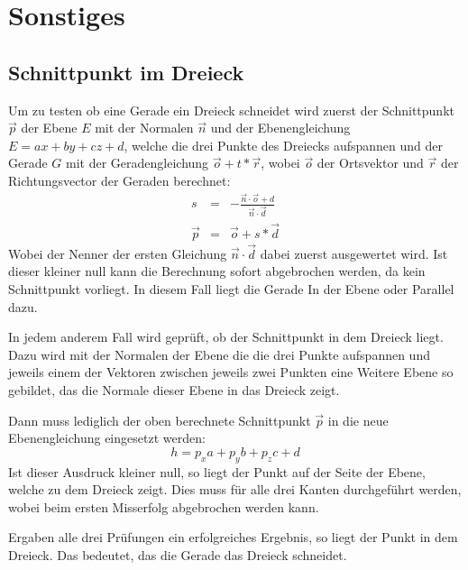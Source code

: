 \documentclass[final,a4paper,11pt,notitlepage,halfparskip]{scrreprt}
\begin{document}
\section{Sonstiges}
\subsection{Schnittpunkt im Dreieck}
Um zu testen ob eine Gerade ein Dreieck schneidet wird zuerst der Schnittpunkt
$\vec{p}$ der Ebene $E$ mit der Normalen $\vec{n}$ und der Ebenengleichung $E =
ax + by + cz + d$, welche die drei Punkte des Dreiecks aufspannen und der Gerade 
$G$ mit der Geradengleichung $\vec{o} + t*\vec{r}$, wobei $\vec{o}$ der 
Ortsvektor und $\vec{r}$ der Richtungsvector der Geraden berechnet:
\begin{eqnarray*}
    s       &=& -\frac{\vec{n} \cdot \vec{o} + d}{\vec{n} \cdot \vec{d}}\\
    \vec{p} &=& \vec{o} + s * \vec{d}
\end{eqnarray*}
Wobei der Nenner der ersten Gleichung $\vec{n} \cdot \vec{d}$ dabei zuerst
ausgewertet wird. Ist dieser kleiner null kann die Berechnung sofort abgebrochen
werden, da kein Schnittpunkt vorliegt. In diesem Fall liegt die Gerade In der
Ebene oder Parallel dazu.

In jedem anderem Fall wird geprüft, ob der Schnittpunkt in dem Dreieck liegt.
Dazu wird mit der Normalen der Ebene die die drei Punkte aufspannen und jeweils
einem der Vektoren zwischen jeweils zwei Punkten eine Weitere Ebene so gebildet,
das die Normale dieser Ebene in das Dreieck zeigt.

Dann muss lediglich der oben berechnete Schnittpunkt $\vec{p}$ in die neue
Ebenengleichung eingesetzt werden:
$$h = p_x a + p_y b + p_z c + d$$
Ist dieser Ausdruck kleiner null, so liegt der Punkt auf der Seite der Ebene,
welche zu dem Dreieck zeigt. Dies muss für alle drei Kanten durchgeführt werden,
wobei beim ersten Misserfolg abgebrochen werden kann.

Ergaben alle drei Prüfungen ein erfolgreiches Ergebnis, so liegt der Punkt in
dem Dreieck. Das bedeutet, das die Gerade das Dreieck schneidet.
\end{document}
